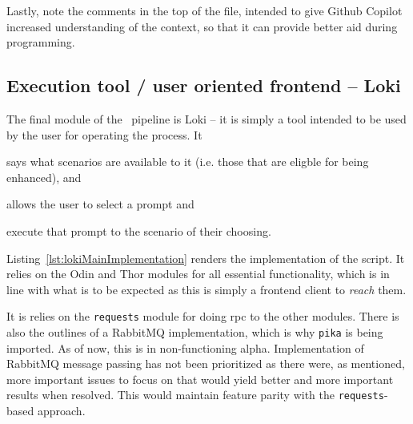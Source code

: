 


Lastly, note the comments in the top of the file, intended to give Github
Copilot increased understanding of the context, so that it can provide better
aid during programming.


\subsection{Execution tool / user oriented frontend -- Loki}


The final module of the \hefe~pipeline is Loki -- it is simply a tool intended
to be used by the user for operating the process. It \begin{inparaenum}
    \item  says what scenarios are available to it (i.e. those that are eligble for
    being enhanced), and
    \item allows the user to select a prompt and
    \item execute that prompt to the scenario of their choosing.
\end{inparaenum}



Listing~\ref{lst:lokiMainImplementation} renders the implementation of the
script. It relies on the Odin and Thor modules for all essential functionality,
which is in line with what is to be expected as this is simply a frontend client
to \emph{reach} them.

It is relies on the \texttt{requests} module for doing \acrfull{rpc} to the
other modules. There is also the outlines of a RabbitMQ implementation, which is
why \texttt{pika} is being imported. As of now, this is in non-functioning
alpha. Implementation of RabbitMQ message passing has not been prioritized as
there were, as mentioned, more important issues to focus on that would yield
better and more important results when resolved. This would maintain feature
parity with the \texttt{requests}-based approach.